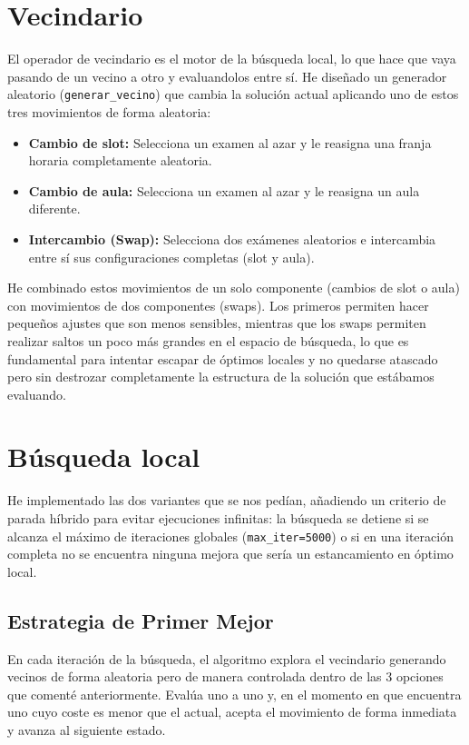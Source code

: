 \documentclass[12pt]{article}
\begin{document}
\section{Vecindario}
El operador de vecindario es el motor de la búsqueda local, lo que hace que vaya pasando de un vecino a otro y evaluandolos entre sí. He diseñado un generador aleatorio (\texttt{generar\_vecino}) que cambia la solución actual aplicando uno de estos tres movimientos de forma aleatoria:
\begin{itemize}
    \item \textbf{Cambio de slot:} Selecciona un examen al azar y le reasigna una franja horaria completamente aleatoria.
    \item \textbf{Cambio de aula:} Selecciona un examen al azar y le reasigna un aula diferente.
    \item \textbf{Intercambio (Swap):} Selecciona dos exámenes aleatorios e intercambia entre sí sus configuraciones completas (slot y aula).
\end{itemize}

He combinado estos movimientos de un solo componente (cambios de slot o aula) con movimientos de dos componentes (swaps). Los primeros permiten hacer pequeños ajustes que son menos sensibles, mientras que los swaps permiten realizar saltos un poco más grandes en el espacio de búsqueda, lo que es fundamental para intentar escapar de óptimos locales y no quedarse atascado pero sin destrozar completamente la estructura de la solución que estábamos evaluando.

\section{Búsqueda local}
He implementado las dos variantes que se nos pedían, añadiendo un criterio de parada híbrido para evitar ejecuciones infinitas: la búsqueda se detiene si se alcanza el máximo de iteraciones globales (\texttt{max\_iter=5000}) o si en una iteración completa no se encuentra ninguna mejora que sería un estancamiento en óptimo local.

\subsection{Estrategia de Primer Mejor}
En cada iteración de la búsqueda, el algoritmo explora el vecindario generando vecinos de forma aleatoria pero de manera controlada dentro de las 3 opciones que comenté anteriormente. Evalúa uno a uno y, en el momento en que encuentra uno cuyo coste es menor que el actual, acepta el movimiento de forma inmediata y avanza al siguiente estado.
\end{document}
